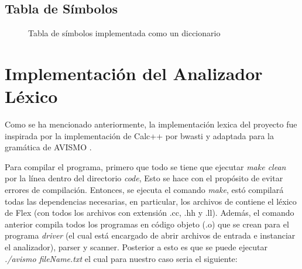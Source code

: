 \subsection{Tabla de Símbolos}

\begin{figure}[H]
    \label{fig: tablaDeSimbolos}
    \caption{Tabla de símbolos implementada como un diccionario}
\end{figure}

\section{Implementación del Analizador Léxico}


Como se ha mencionado anteriormente, la implementación lexica del proyecto fue inspirada por la implementación de Calc++ por bwasti y adaptada para la gramática de AVISMO \cite{wasti_bwastibison-example-calc-_2020}. 

Para compilar el programa, primero que todo se tiene que ejecutar \textit{make clean} por la línea dentro del directorio \textit{code}, Esto se hace con el propósito de evitar errores de compilación.
Entonces, se ejecuta el comando \textit{make}, estó compilará todas las dependencias necesarias, en particular, los archivos de contiene el léxico de Flex (con todos los archivos con extensión .cc, .hh y .ll).
Además, el comando anterior compila todos los programas en código objeto (.o) que se crean para el programa \textit{driver} (el cual está encargado de abrir archivos de entrada e instanciar el analizador), parser y scanner.
Posterior a esto es que se puede ejecutar \textit{./avismo fileName.txt} el cual para nuestro caso seria el siguiente: 

